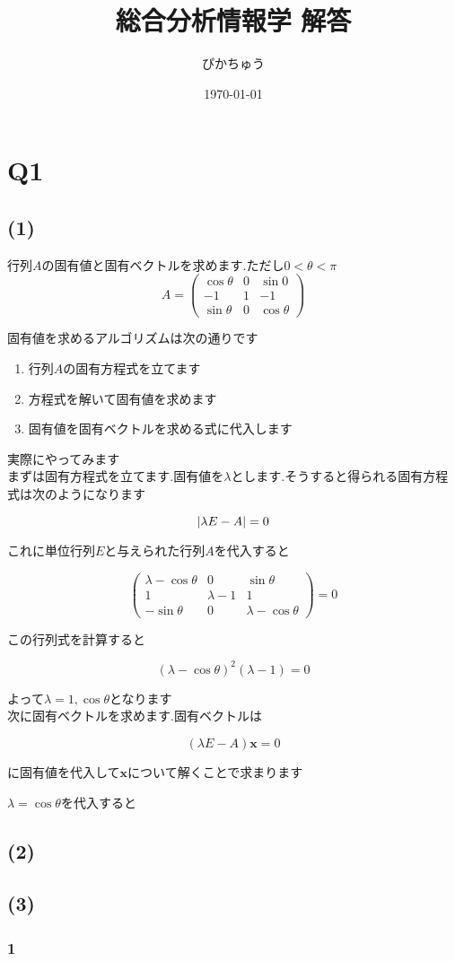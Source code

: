 \documentclass[twocolumn]{article}
\title{総合分析情報学 解答}
\author{ぴかちゅう}
\date{\today}
\begin{document}
\maketitle

\section*{Q1}
\subsection*{(1)}
行列\(A\)の固有値と固有ベクトルを求めます.ただし\(0 < \theta < \pi\)
\[
    A = \begin{pmatrix}
        \cos \theta & 0 & \sin 0      \\
        -1          & 1 & -1          \\
        \sin \theta & 0 & \cos \theta
    \end{pmatrix}
\]

固有値を求めるアルゴリズムは次の通りです\\

\begin{enumerate}
    \item 行列$A$の固有方程式を立てます
    \item 方程式を解いて固有値を求めます
    \item 固有値を固有ベクトルを求める式に代入します
\end{enumerate}

実際にやってみます\\

まずは固有方程式を立てます.固有値を$\lambda$とします.そうすると得られる固有方程式は次のようになります

$$
    |\lambda E - A| = 0\\
$$

これに単位行列$E$と与えられた行列$A$を代入すると

$$
    \left(
    \begin{array}{ccc}
            \lambda - \cos \theta & 0           & \sin \theta           \\
            1                     & \lambda - 1 & 1                     \\
            - \sin \theta         & 0           & \lambda - \cos \theta
        \end{array}
    \right) = 0
$$

この行列式を計算すると

$$
    (\lambda - \cos \theta)^2(\lambda - 1) = 0
$$

よって$\lambda = 1, \cos \theta$となります\\

次に固有ベクトルを求めます.固有ベクトルは

$$
(\lambda E - A)\bm{x} = 0
$$

に固有値を代入して$\bm{x}$について解くことで求まります

$\lambda = \cos \theta$を代入すると

\subsection*{(2)}
\subsection*{(3)}
\subsubsection*{1}
\end{document}
